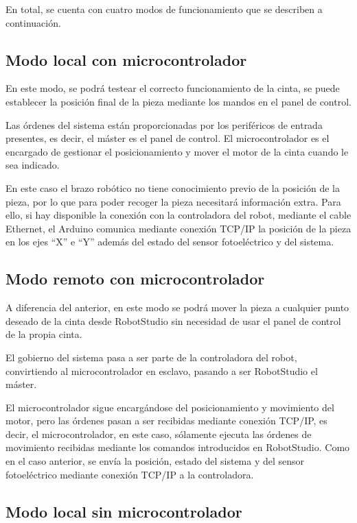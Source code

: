 En total, se cuenta con cuatro modos de funcionamiento que se describen a continuación. 

\subsection{Modo local con microcontrolador}\label{subsec-01}

En este modo, se podrá testear el correcto funcionamiento de la cinta, se puede establecer la posición final de la pieza mediante los mandos en el panel de control.

Las órdenes del sistema están proporcionadas por los periféricos de entrada presentes, es decir, el máster es el panel de control. El microcontrolador es el encargado de gestionar el posicionamiento y mover el motor de la cinta cuando le sea indicado. 

En este caso el brazo robótico no tiene conocimiento previo de la posición de la pieza, por lo que para poder recoger la pieza necesitará información extra. Para ello, si hay disponible la conexión con la controladora del robot, mediante el cable Ethernet, el Arduino comunica mediante conexión TCP/IP la posición de la pieza en los ejes “X” e “Y” además del estado del sensor fotoeléctrico y del sistema.

\subsection{Modo remoto con microcontrolador}\label{subsec-02}

A diferencia del anterior, en este modo se podrá mover la pieza a cualquier punto deseado de la cinta desde RobotStudio sin necesidad de usar el panel de control de la propia cinta.

El gobierno del sistema pasa a ser parte de la controladora del robot, convirtiendo al microcontrolador en esclavo, pasando a ser RobotStudio el máster.

El microcontrolador sigue encargándose del posicionamiento y movimiento del motor, pero las órdenes pasan a ser recibidas mediante conexión TCP/IP, es decir, el microcontrolador, en este caso, sólamente ejecuta las órdenes de movimiento recibidas mediante los comandos introducidos en RobotStudio. Como en el caso anterior, se envía la posición, estado del sistema y del sensor fotoeléctrico mediante conexión TCP/IP a la controladora.

\subsection{Modo local sin microcontrolador}\label{subsec-03}


